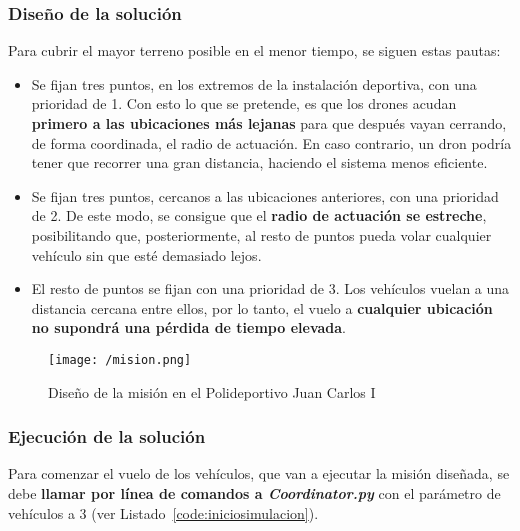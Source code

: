 \subsubsection{Diseño de la solución}

Para cubrir el mayor terreno posible en el menor tiempo, se siguen estas pautas:

\begin{itemize}
\item Se fijan tres puntos, en los extremos de la instalación deportiva, con una prioridad de 1. Con esto lo que se pretende, es que los drones acudan \textbf{primero a las ubicaciones más lejanas} para que después vayan cerrando, de forma coordinada, el radio de actuación. En caso contrario, un dron podría tener que recorrer una gran distancia, haciendo el sistema menos eficiente.
\item Se fijan tres puntos, cercanos a las ubicaciones anteriores, con una prioridad de 2. De este modo, se consigue que el \textbf{radio de actuación se estreche}, posibilitando que, posteriormente, al resto de puntos pueda volar cualquier vehículo sin que esté demasiado lejos.
\item El resto de puntos se fijan con una prioridad de 3. Los vehículos vuelan a una distancia cercana entre ellos, por lo tanto, el vuelo a \textbf{cualquier ubicación no supondrá una pérdida de tiempo elevada}.
\end{itemize}

\begin{figure}[!h]
\begin{center}
\texttt{[image: /mision.png]}
\caption[Diseño de la misión en el Polideportivo Juan Carlos I]{Diseño de la misión en el Polideportivo Juan Carlos I}
\label{fig:mision}
\end{center}
\end{figure}

\subsubsection{Ejecución de la solución}

Para comenzar el vuelo de los vehículos, que van a ejecutar la misión diseñada, se debe \textbf{llamar por línea de comandos a \textit{Coordinator.py}} con el parámetro de vehículos a 3 (ver Listado~\ref{code:iniciosimulacion}).


